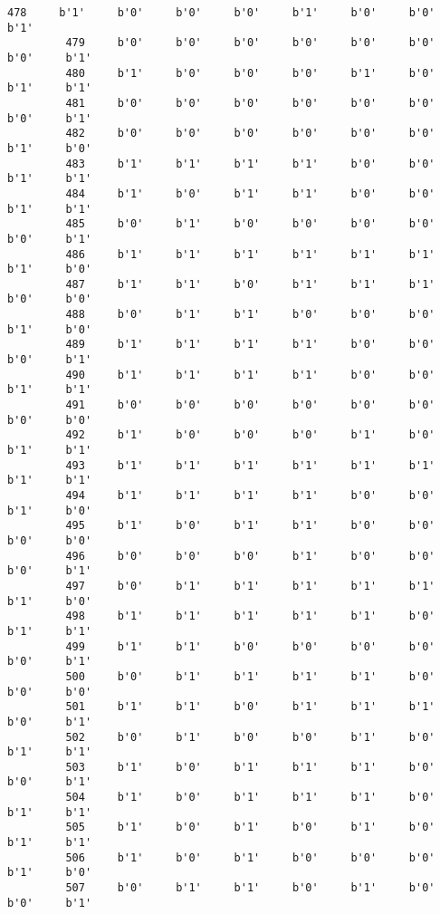\documentclass[11pt]{article}
\begin{document}
\begin{Verbatim}[commandchars=\\\{\}]
         478     b'1'     b'0'     b'0'     b'0'     b'1'     b'0'     b'0'     b'1'   
         479     b'0'     b'0'     b'0'     b'0'     b'0'     b'0'     b'0'     b'1'   
         480     b'1'     b'0'     b'0'     b'0'     b'1'     b'0'     b'1'     b'1'   
         481     b'0'     b'0'     b'0'     b'0'     b'0'     b'0'     b'0'     b'1'   
         482     b'0'     b'0'     b'0'     b'0'     b'0'     b'0'     b'1'     b'0'   
         483     b'1'     b'1'     b'1'     b'1'     b'0'     b'0'     b'1'     b'1'   
         484     b'1'     b'0'     b'1'     b'1'     b'0'     b'0'     b'1'     b'1'   
         485     b'0'     b'1'     b'0'     b'0'     b'0'     b'0'     b'0'     b'1'   
         486     b'1'     b'1'     b'1'     b'1'     b'1'     b'1'     b'1'     b'0'   
         487     b'1'     b'1'     b'0'     b'1'     b'1'     b'1'     b'0'     b'0'   
         488     b'0'     b'1'     b'1'     b'0'     b'0'     b'0'     b'1'     b'0'   
         489     b'1'     b'1'     b'1'     b'1'     b'0'     b'0'     b'0'     b'1'   
         490     b'1'     b'1'     b'1'     b'1'     b'0'     b'0'     b'1'     b'1'   
         491     b'0'     b'0'     b'0'     b'0'     b'0'     b'0'     b'0'     b'0'   
         492     b'1'     b'0'     b'0'     b'0'     b'1'     b'0'     b'1'     b'1'   
         493     b'1'     b'1'     b'1'     b'1'     b'1'     b'1'     b'1'     b'1'   
         494     b'1'     b'1'     b'1'     b'1'     b'0'     b'0'     b'1'     b'0'   
         495     b'1'     b'0'     b'1'     b'1'     b'0'     b'0'     b'0'     b'0'   
         496     b'0'     b'0'     b'0'     b'1'     b'0'     b'0'     b'0'     b'1'   
         497     b'0'     b'1'     b'1'     b'1'     b'1'     b'1'     b'1'     b'0'   
         498     b'1'     b'1'     b'1'     b'1'     b'1'     b'0'     b'1'     b'1'   
         499     b'1'     b'1'     b'0'     b'0'     b'0'     b'0'     b'0'     b'1'   
         500     b'0'     b'1'     b'1'     b'1'     b'1'     b'0'     b'0'     b'0'   
         501     b'1'     b'1'     b'0'     b'1'     b'1'     b'1'     b'0'     b'1'   
         502     b'0'     b'1'     b'0'     b'0'     b'1'     b'0'     b'1'     b'1'   
         503     b'1'     b'0'     b'1'     b'1'     b'1'     b'0'     b'0'     b'1'   
         504     b'1'     b'0'     b'1'     b'1'     b'1'     b'0'     b'1'     b'1'   
         505     b'1'     b'0'     b'1'     b'0'     b'1'     b'0'     b'1'     b'1'   
         506     b'1'     b'0'     b'1'     b'0'     b'0'     b'0'     b'1'     b'0'   
         507     b'0'     b'1'     b'1'     b'0'     b'1'     b'0'     b'0'     b'1'   

\end{Verbatim}
\end{document}
